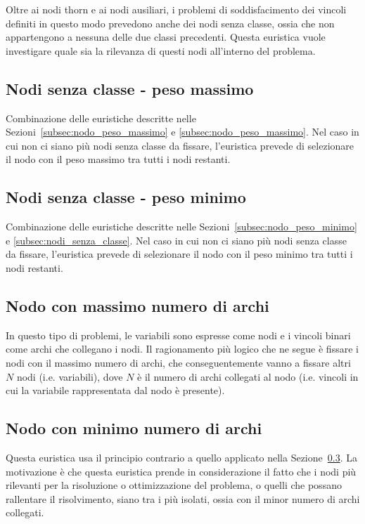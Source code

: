 Oltre ai nodi thorn e ai nodi ausiliari, i problemi di soddisfacimento dei vincoli definiti in questo modo prevedono anche dei nodi senza classe, ossia che non appartengono a nessuna delle due classi precedenti. Questa euristica vuole investigare quale sia la rilevanza di questi nodi all'interno del problema.

\subsection{Nodi senza classe - peso massimo}

Combinazione delle euristiche descritte nelle Sezioni~\ref{subsec:nodo_peso_massimo} e \ref{subsec:nodo_peso_massimo}. Nel caso in cui non ci siano più nodi senza classe da fissare, l'euristica prevede di selezionare il nodo con il peso massimo tra tutti i nodi restanti.

\subsection{Nodi senza classe - peso minimo}

Combinazione delle euristiche descritte nelle Sezioni~\ref{subsec:nodo_peso_minimo} e \ref{subsec:nodi_senza_classe}. Nel caso in cui non ci siano più nodi senza classe da fissare, l'euristica prevede di selezionare il nodo con il peso minimo tra tutti i nodi restanti.

\subsection{Nodo con massimo numero di archi}\label{subsec:nodo_massimo_numero_archi}

In questo tipo di problemi, le variabili sono espresse come nodi e i vincoli binari come archi che collegano i nodi. Il ragionamento più logico che ne segue è fissare i nodi con il massimo numero di archi, che conseguentemente vanno a fissare altri $N$ nodi (i.e. variabili), dove $N$ è il numero di archi collegati al nodo (i.e. vincoli in cui la variabile rappresentata dal nodo è presente).

\subsection{Nodo con minimo numero di archi}

Questa euristica usa il principio contrario a quello applicato nella Sezione~\ref{subsec:nodo_massimo_numero_archi}. La motivazione è che questa euristica prende in considerazione il fatto che i nodi più rilevanti per la risoluzione o ottimizzazione del problema, o quelli che possano rallentare il risolvimento, siano tra i più isolati, ossia con il minor numero di archi collegati.